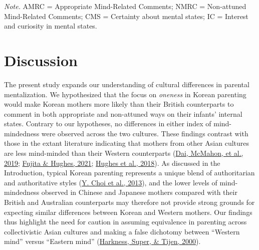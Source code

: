 \documentclass[
]{article}
\begin{document}
\emph{Note.} AMRC = Appropriate Mind-Related Comments; NMRC = Non-attuned Mind-Related Comments; CMS = Certainty about mental states; IC = Interest and curiosity in mental states.

\hypertarget{discussion}{%
\section*{Discussion}\label{discussion}}

The present study expands our understanding of cultural differences in parental mentalization. We hypothesized that the focus on \emph{oneness} in Korean parenting would make Korean mothers more likely than their British counterparts to comment in both appropriate and non-attuned ways on their infants' internal states. Contrary to our hypotheses, no differences in either index of mind-mindedness were observed across the two cultures. These findings contrast with those in the extant literature indicating that mothers from other Asian cultures are less mind-minded than their Western counterparts (\protect\hyperlink{ref-Dai2019b}{Dai, McMahon, et al., 2019}; \protect\hyperlink{ref-Fujita2021}{Fujita \& Hughes, 2021}; \protect\hyperlink{ref-Hughes2018}{Hughes et al., 2018}). As discussed in the Introduction, typical Korean parenting represents a unique blend of authoritarian and authoritative styles (\protect\hyperlink{ref-Choi2013}{Y. Choi et al., 2013}), and the lower levels of mind-mindedness observed in Chinese and Japanese mothers compared with their British and Australian counterparts may therefore not provide strong grounds for expecting similar differences between Korean and Western mothers. Our findings thus highlight the need for caution in assuming equivalence in parenting across collectivistic Asian cultures and making a false dichotomy between ``Western mind'' versus ``Eastern mind'' (\protect\hyperlink{ref-Harkness2000}{Harkness, Super, \& Tijen, 2000}).
\end{document}
